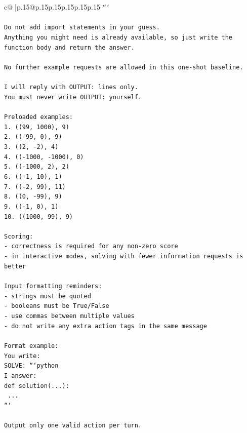 \documentclass{article}
\begin{document}
{\begin{supertabular}{c@{$\;$}|p{.15\linewidth}@{}p{.15\linewidth}p{.15\linewidth}p{.15\linewidth}p{.15\linewidth}p{.15\linewidth}}
{{{\texttt{```} \\
\\ 
\texttt{Do not add import statements in your guess.} \\
\texttt{Anything you might need is already available, so just write the function body and return the answer.} \\
\\ 
\texttt{No further example requests are allowed in this one{-}shot baseline.} \\
\\ 
\texttt{I will reply with OUTPUT: lines only.} \\
\texttt{You must never write OUTPUT: yourself.} \\
\\ 
\texttt{Preloaded examples:} \\
\texttt{1. ((99, 1000), 9)} \\
\texttt{2. (({-}99, 0), 9)} \\
\texttt{3. ((2, {-}2), 4)} \\
\texttt{4. (({-}1000, {-}1000), 0)} \\
\texttt{5. (({-}1000, 2), 2)} \\
\texttt{6. (({-}1, 10), 1)} \\
\texttt{7. (({-}2, 99), 11)} \\
\texttt{8. ((0, {-}99), 9)} \\
\texttt{9. (({-}1, 0), 1)} \\
\texttt{10. ((1000, 99), 9)} \\
\\ 
\texttt{Scoring:} \\
\texttt{{-} correctness is required for any non{-}zero score} \\
\texttt{{-} in interactive modes, solving with fewer information requests is better} \\
\\ 
\texttt{Input formatting reminders:} \\
\texttt{{-} strings must be quoted} \\
\texttt{{-} booleans must be True/False} \\
\texttt{{-} use commas between multiple values} \\
\texttt{{-} do not write any extra action tags in the same message} \\
\\ 
\texttt{Format example:} \\
\texttt{You write:} \\
\texttt{SOLVE: ```python} \\
\texttt{I answer:} \\
\texttt{def solution(...):} \\
\texttt{    ...} \\
\texttt{```} \\
\\ 
\texttt{Output only one valid action per turn.} \\
            }
        }
    }
     \\ \\


\end{supertabular}}
\end{document}

